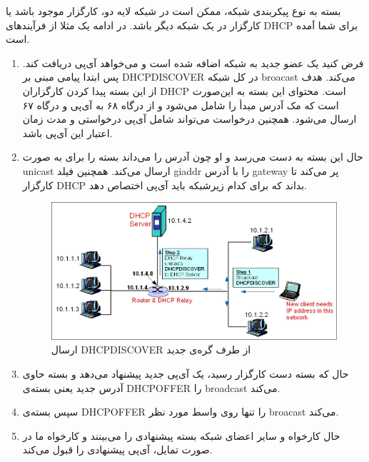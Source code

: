 بسته به نوع پیکربندی شبکه، ممکن است در شبکه لایه دو، کارگزار موجود باشد یا کارگزار در یک شبکه دیگر باشد. در ادامه یک مثلا از فرآیند‌های DHCP برای شما آمده است.

\begin{enumerate}
\item
 فرض کنید یک عضو جدید به شبکه اضافه شده است و می‌خواهد آی‌پی دریافت کند. پس ابتدا پیامی مبنی بر DHCPDISCOVER در کل شبکه broacast می‌کند. هدف از این بسته پیدا کردن کارگزاران DHCP است. محتوای این بسته به این‌صورت است که مک آدرس مبدأ را شامل می‌شود و از درگاه ۶۸ به آی‌پی
 و درگاه 
 ۶۷
 ارسال می‌شود. همچنین درخواست می‌تواند شامل آی‌پی درخواستی و مدت زمان اعتبار این آی‌پی باشد.
 
 \item
 حال این بسته به دست  می‌رسد و او  چون آدرس  را می‌داند بسته را برای  به صورت unicast ارسال می‌کند. همچنین فیلد giaddr را با آدرس gateway 
 پر می‌کند تا کارگزار DHCP بداند که برای کدام زیرشبکه  باید آی‌پی اختصاص دهد.  
 \begin{figure}[h!]
	\begin{center}
 		\caption{ارسال DHCPDISCOVER از طرف گره‌ی جدید }
		\includegraphics[scale=.4]{DHCP1.jpg}
	\end{center}
\end{figure}

 \item
 حال که بسته دست کارگزار رسید، یک آی‌پی جدید پیشنهاد می‌دهد و بسته حاوی آدرس جدید یعنی بسته‌ی DHCPOFFER را  broadcast می‌کند.
 
 \item
 سپس 
  بسته‌ی DHCPOFFER را تنها روی واسط مورد نظر broacast می‌کند.
 
 \item
 حال کارخواه و سایر اعضای شبکه بسته پیشنهادی را می‌بینند و کارخواه ما در صورت تمایل، آی‌پی پیشنهادی را قبول می‌کند.


\end{enumerate}
